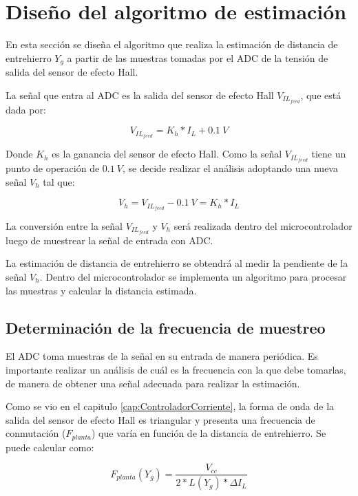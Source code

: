 \section{Diseño del algoritmo de estimación}

En esta sección se diseña el algoritmo que realiza la estimación de distancia de entrehierro $Y_g$ a partir de las muestras tomadas por el ADC de la tensión de salida del sensor de efecto Hall.

La señal que entra al ADC es la salida del sensor de efecto Hall $V_{IL_{feed}}$, que está dada por:

\begin{equation*}
	V_{IL_{feed}}=K_h*I_L+0.1\:V
\end{equation*}

Donde $K_h$ es la ganancia del sensor de efecto Hall. Como la señal $V_{IL_{feed}}$ tiene un punto de operación de $0.1\:V$, se decide realizar el análisis adoptando una nueva señal $V_h$ tal que:

\begin{equation*}
	V_h=V_{IL_{feed}}-0.1\:V=K_h*I_L
\end{equation*}


La conversión entre la señal $V_{IL_{feed}}$ y $V_h$ será realizada dentro del microcontrolador luego de muestrear la señal de entrada con ADC.

La estimación de distancia de entrehierro se obtendrá al medir la pendiente de la señal $V_h$. Dentro del microcontrolador se implementa un algoritmo para procesar las muestras y calcular la distancia estimada. 

\subsection{Determinación de la frecuencia de muestreo}

El ADC toma muestras de la señal en su entrada de manera periódica. Es importante realizar un análisis de cuál es la frecuencia con la que debe tomarlas, de manera de obtener una señal adecuada para realizar la estimación.

Como se vio en el capitulo \ref{cap:ControladorCorriente}, la forma de onda de la salida del sensor de efecto Hall es triangular y presenta una frecuencia de conmutación ($F_{planta}$) que varía en función de la distancia de entrehierro. Se puede calcular como:

\begin{equation} \label{eq_frecuencia-de-muestreo}
	F_{planta}(Y_g)=\frac{V_{cc}}{2 * L(Y_g) * \Delta I_L}
\end{equation}


